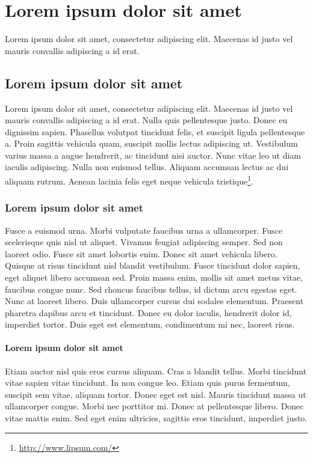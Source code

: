 \chapter{Lorem ipsum dolor sit amet}\label{chp:LABEL_CHP_1}

Lorem ipsum dolor sit amet, consectetur adipiscing elit. Maecenas id justo vel mauris convallis adipiscing a id erat. 

\section{Lorem ipsum dolor sit amet}\label{sec:LABEL_CHP_1_SEC_A}
Lorem ipsum dolor sit amet, consectetur adipiscing elit. Maecenas id justo vel mauris convallis adipiscing a id erat. Nulla quis pellentesque justo. Donec eu dignissim sapien. Phasellus volutpat tincidunt felis, et suscipit ligula pellentesque a. Proin sagittis vehicula quam, suscipit mollis lectus adipiscing ut. Vestibulum varius massa a augue hendrerit, ac tincidunt nisi auctor. Nunc vitae leo ut diam iaculis adipiscing. Nulla non euismod tellus. Aliquam accumsan lectus ac dui aliquam rutrum. Aenean lacinia felis eget neque vehicula tristique\footnote{\url{http://www.lipsum.com/}}.

\subsection{Lorem ipsum dolor sit amet}\label{sec:LABEL_CHP_1_SEC_B}
Fusce a euismod urna. Morbi vulputate faucibus urna a ullamcorper. Fusce scelerisque quis nisl ut aliquet. Vivamus feugiat adipiscing semper. Sed non laoreet odio. Fusce sit amet lobortis enim. Donec sit amet vehicula libero. Quisque at risus tincidunt nisl blandit vestibulum. Fusce tincidunt dolor sapien, eget aliquet libero accumsan sed. Proin massa enim, mollis sit amet metus vitae, faucibus congue nunc. Sed rhoncus faucibus tellus, id dictum arcu egestas eget. Nunc at laoreet libero. Duis ullamcorper cursus dui sodales elementum. Praesent pharetra dapibus arcu et tincidunt. Donec eu dolor iaculis, hendrerit dolor id, imperdiet tortor. Duis eget est elementum, condimentum mi nec, laoreet risus.

\subsubsection{Lorem ipsum dolor sit amet}\label{sec:LABEL_CHP_1_SEC_C}
Etiam auctor nisl quis eros cursus aliquam. Cras a blandit tellus. Morbi tincidunt vitae sapien vitae tincidunt. In non congue leo. Etiam quis purus fermentum, suscipit sem vitae, aliquam tortor. Donec eget est nisl. Mauris tincidunt massa ut ullamcorper congue. Morbi nec porttitor mi. Donec at pellentesque libero. Donec vitae mattis enim. Sed eget enim ultricies, sagittis eros tincidunt, imperdiet justo.


